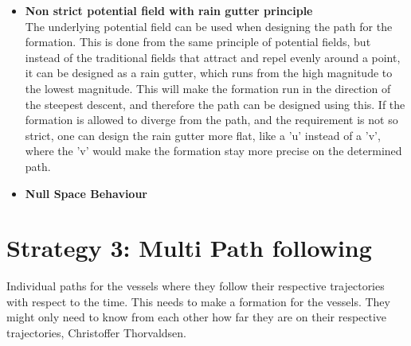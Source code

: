 \begin{itemize}
\item \textbf{Non strict potential field with rain gutter principle}\\
The underlying potential field can be used when designing the path for the formation. This is done from the same principle of potential fields, but instead of the traditional fields that attract and repel evenly around a point, it can be designed as a rain gutter, which runs from the high magnitude to the lowest magnitude. This will make the formation run in the direction of the steepest descent, and therefore the path can be designed using this. If the formation is allowed to diverge from the path, and the requirement is not so strict, one can design the rain gutter more flat, like a 'u' instead of a 'v', where the 'v' would make the formation stay more precise on the determined path.
\item \textbf{Null Space Behaviour}

\end{itemize}





\section{Strategy 3: Multi Path following}
Individual paths for the vessels where they follow their respective trajectories with respect to the time. This needs to make a formation for the vessels. They might only need to know from each other how far they are on their respective trajectories, Christoffer Thorvaldsen.



